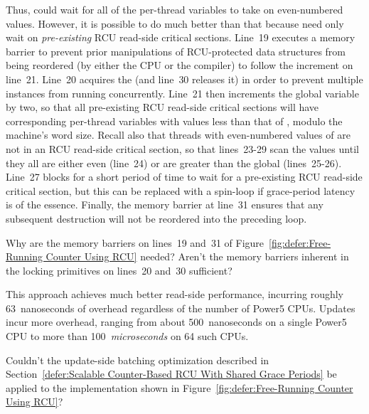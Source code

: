 Thus,  could wait for all of the per-thread
 variables to take on even-numbered values.
However, it is possible to do much better than that because
 need only wait on \emph{pre-existing}
RCU read-side critical sections.
Line~19 executes a memory barrier to prevent prior manipulations
of RCU-protected data structures from being reordered (by either
the CPU or the compiler) to follow the increment on line~21.
Line~20 acquires the  (and line~30 releases it)
in order to prevent multiple
 instances from running concurrently.
Line~21 then increments the global  variable by
two, so that all pre-existing RCU read-side critical sections will
have corresponding per-thread  variables with
values less than that of , modulo the machine's
word size.
Recall also that threads with even-numbered values of 
are not in an RCU read-side critical section,
so that lines~23-29 scan the  values until they
all are either even (line~24) or are greater than the global
 (lines~25-26).
Line~27 blocks for a short period of time to wait for a
pre-existing RCU read-side critical section, but this can be replaced with
a spin-loop if grace-period latency is of the essence.
Finally, the memory barrier at line~31 ensures that any subsequent
destruction will not be reordered into the preceding loop.

\QuickQuiz{}
	Why are the memory barriers on lines~19 and~31 of
	Figure~\ref{fig:defer:Free-Running Counter Using RCU}
	needed?
	Aren't the memory barriers inherent in the locking
	primitives on lines~20 and~30 sufficient?
 \QuickQuizEnd

This approach achieves much better read-side performance, incurring
roughly 63~nanoseconds of overhead regardless of the number of
Power5 CPUs.
Updates incur more overhead, ranging from about 500~nanoseconds on
a single Power5 CPU to more than 100~\emph{microseconds} on 64
such CPUs.

\QuickQuiz{}
	Couldn't the update-side batching optimization described in
	Section~\ref{defer:Scalable Counter-Based RCU With Shared Grace Periods}
	be applied to the implementation shown in
	Figure~\ref{fig:defer:Free-Running Counter Using RCU}?
 \QuickQuizEnd

